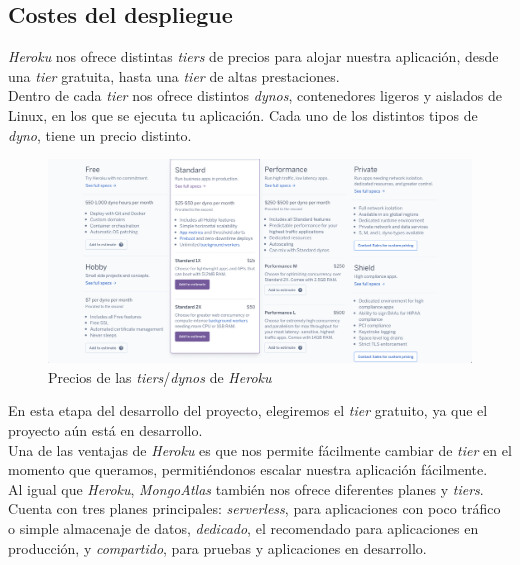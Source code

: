 \subsection{Costes del despliegue}\label{sec:costes-despliegue}
\textit{Heroku} nos ofrece distintas \textit{tiers} de precios para alojar nuestra aplicación, desde una \textit{tier}
gratuita, hasta una \textit{tier} de altas prestaciones.\\

Dentro de cada \textit{tier} nos ofrece distintos \textit{dynos}, contenedores ligeros y aislados de Linux, en los que
se ejecuta tu aplicación. Cada uno de los distintos tipos de \textit{dyno}, tiene un precio distinto.\\

\begin{figure}[H]
    \centering	
        \includegraphics[scale=0.25]{img/heroku-tiers.png}
    \caption{ Precios de las \textit{tiers}/\textit{dynos} de \textit{Heroku} }\label{fig:heroku-tiers}
\end{figure}

En esta etapa del desarrollo del proyecto, elegiremos el \textit{tier} gratuito, ya que el proyecto aún está en
desarrollo.\\

Una de las ventajas de \textit{Heroku} es que nos permite fácilmente cambiar de \textit{tier} en el momento que
queramos, permitiéndonos escalar nuestra aplicación fácilmente.\\

Al igual que \textit{Heroku}, \textit{MongoAtlas} también nos ofrece diferentes planes y \textit{tiers}.\\

Cuenta con tres planes principales: \textit{serverless}, para aplicaciones con poco tráfico o simple almacenaje de
datos, \textit{dedicado}, el recomendado para aplicaciones en producción, y \textit{compartido}, para pruebas y 
aplicaciones en desarrollo.\\

